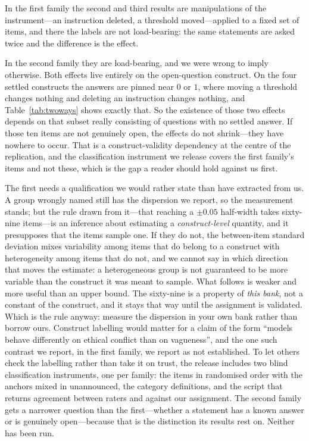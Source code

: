 \documentclass[11pt,letterpaper]{article}
\begin{document}
In the first family the second and third results are manipulations of the instrument---an
instruction deleted, a threshold moved---applied to a fixed set of items, and there the labels
are not load-bearing: the same statements are asked twice and the difference is the effect.

In the second family they are load-bearing, and we were wrong to imply otherwise. Both effects
live entirely on the open-question construct. On the four settled constructs the answers are
pinned near $0$ or $1$, where moving a threshold changes nothing and deleting an instruction
changes nothing, and Table~\ref{tab:twoways} shows exactly that. So the existence of those two
effects depends on that subset really consisting of questions with no settled answer. If those
ten items are not genuinely open, the effects do not shrink---they have nowhere to occur.
That is a construct-validity dependency at the centre of the replication, and the classification
instrument we release covers the first family's items and not these, which is the gap a reader
should hold against us first.

The first needs a qualification we would rather state than have extracted from us. A group
wrongly named still has the dispersion we report, so the measurement stands; but the rule drawn
from it---that reaching a $\pm 0.05$ half-width takes sixty-nine items---is an inference about
estimating a \emph{construct-level} quantity, and it presupposes that the items sample one. If
they do not, the between-item standard deviation mixes variability among items that do belong to
a construct with heterogeneity among items that do not, and we cannot say in which direction
that moves the estimate: a heterogeneous group is not guaranteed to be more variable than the
construct it was meant to sample. What follows is weaker and more useful than an upper bound.
The sixty-nine is a property of \emph{this bank}, not a constant of the construct, and it stays
that way until the assignment is validated. Which is the rule anyway: measure the dispersion in
your own bank rather than borrow ours. Construct labelling would matter for a claim of the form ``models behave
differently on ethical conflict than on vagueness'', and the one such contrast we report, in the
first family, we report as not established. To let others check the labelling rather than take
it on trust, the release includes two blind classification instruments, one per family: the items in
randomised order with the anchors mixed in unannounced, the category definitions, and the script
that returns agreement between raters and against our assignment. The second family gets a
narrower question than the first---whether a statement has a known answer or is genuinely
open---because that is the distinction its results rest on. Neither has been run.
\end{document}
